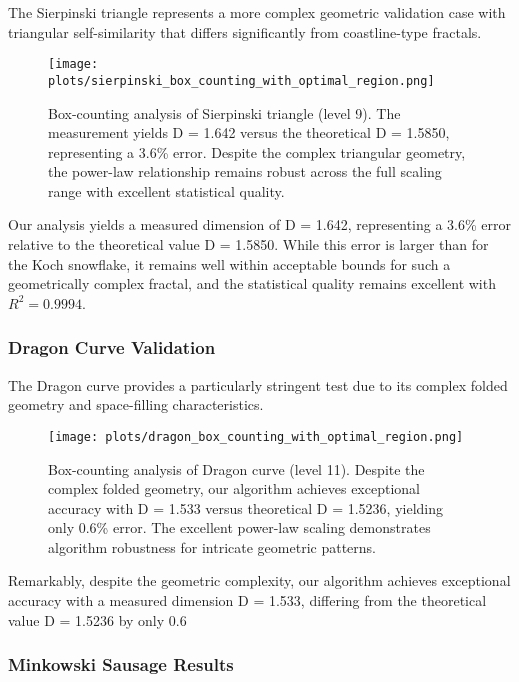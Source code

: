 \documentclass[preprint,12pt]{elsarticle}
\begin{document}
The Sierpinski triangle represents a more complex geometric validation case with triangular self-similarity that differs significantly from coastline-type fractals.

\begin{figure}[ht]
\centering
\texttt{[image: plots/sierpinski\_box\_counting\_with\_optimal\_region.png]}
\caption{Box-counting analysis of Sierpinski triangle (level 9). The measurement yields D = 1.642 versus the theoretical D = 1.5850, representing a 3.6\% error. Despite the complex triangular geometry, the power-law relationship remains robust across the full scaling range with excellent statistical quality.}
\label{fig:sierpinski_boxcounting}
\end{figure}

Our analysis yields a measured dimension of D = 1.642, representing a 3.6\% error relative to the theoretical value D = 1.5850. While this error is larger than for the Koch snowflake, it remains well within acceptable bounds for such a geometrically complex fractal, and the statistical quality remains excellent with $R^2 = 0.9994$.

\subsubsection{Dragon Curve Validation}

The Dragon curve provides a particularly stringent test due to its complex folded geometry and space-filling characteristics.

\begin{figure}[ht]
\centering
\texttt{[image: plots/dragon\_box\_counting\_with\_optimal\_region.png]}
\caption{Box-counting analysis of Dragon curve (level 11). Despite the complex folded geometry, our algorithm achieves exceptional accuracy with D = 1.533 versus theoretical D = 1.5236, yielding only 0.6\% error. The excellent power-law scaling demonstrates algorithm robustness for intricate geometric patterns.}
\label{fig:dragon_boxcounting}
\end{figure}

Remarkably, despite the geometric complexity, our algorithm achieves exceptional accuracy with a measured dimension D = 1.533, differing from the theoretical value D = 1.5236 by only 0.6%

\subsubsection{Minkowski Sausage Results}
\end{document}
